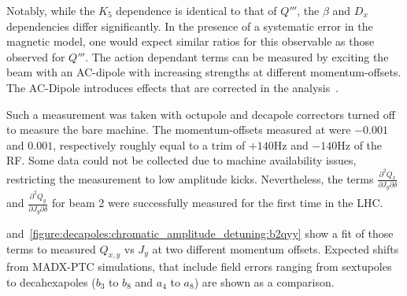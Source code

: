 Notably, while the $K_5$ dependence is identical to that of $Q'''$, the $\beta$ and $D_x$
dependencies differ significantly. In the presence of a systematic error in the magnetic model, one
would expect similar ratios for this observable as those observed for $Q'''$.
The action dependant terms can be measured by exciting the beam with an AC-dipole with increasing
strengths at different momentum-offsets. The AC-Dipole introduces effects that are corrected in the
analysis~\cite{dilly_corrections_2022}.

Such a measurement was taken with octupole and decapole correctors turned off to measure the bare
machine. The momentum-offsets measured at were $-0.001$ and $0.001$, respectively roughly equal to
a trim of $+140$Hz and $-140$Hz of the RF. Some data could not be collected due to machine
availability issues, restricting the measurement to low amplitude kicks.
Nevertheless, the terms $\frac{\partial^2 Q_x}{\partial J_y \partial \delta}$ and $\frac{\partial^2
Q_y}{\partial J_y \partial \delta}$ for beam 2 were successfully measured for the first time in the
LHC. 

and~\cref{figure:decapoles:chromatic_amplitude_detuning:b2qyy} show a fit of those terms to measured
$Q_{x,y}$ vs $J_{y}$ at two different momentum offsets. Expected shifts from MADX-PTC simulations,
that include field errors ranging from sextupoles to decahexapoles ($b_3$ to $b_8$ and $a_4$ to
$a_8$) are shown as a comparison.



